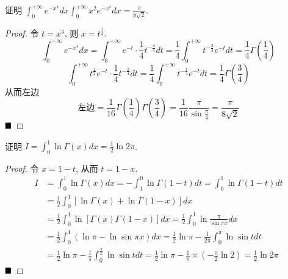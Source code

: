 \documentclass[lang=cn,newtx,10pt,scheme=chinese]{elegantbook}
\begin{document}
\begin{example}
证明 $\int_{0}^{+\infty} e^{-x^4} dx \int_{0}^{+\infty} x^2 e^{-x^4} dx = \frac{\pi}{8\sqrt{2}}$.
\end{example}

\begin{proof}
令 $t=x^4$, 则 $x=t^{\frac{1}{4}}$.
$$
\int_0^{+\infty} e^{-x^4}dx = \int_0^{+\infty} e^{-t} \cdot \frac{1}{4}t^{-\frac{3}{4}}dt = \frac{1}{4}\int_0^{+\infty} t^{-\frac{3}{4}}e^{-t}dt = \frac{1}{4}\Gamma(\frac{1}{4})
$$
$$
\int_0^{+\infty} t^{\frac{1}{2}}e^{-t} \cdot \frac{1}{4}t^{-\frac{3}{4}}dt = \frac{1}{4}\int_0^{+\infty} t^{-\frac{1}{4}}e^{-t}dt = \frac{1}{4}\Gamma(\frac{3}{4})
$$
从而左边
$$
\text{左边}= \frac{1}{16}\Gamma(\frac{1}{4})\Gamma(\frac{3}{4}) = \frac{1}{16}\frac{\pi}{\sin\frac{\pi}{4}} = \frac{\pi}{8\sqrt{2}}
$$
$\hfill \blacksquare$
\end{proof}

\begin{example}[$\bigstar \bigstar$]
证明 $I = \int_{0}^{1} \ln\Gamma(x) dx = \frac{1}{2}\ln 2\pi$.
\end{example}

\begin{proof}
令 $x=1-t$, 从而 $t=1-x$.
\begin{align*}
I &= \int_0^1 \ln\Gamma(x)dx = -\int_1^0 \ln\Gamma(1-t)dt = \int_0^1 \ln\Gamma(1-t)dt \\
&= \frac{1}{2}\int_0^1 [\ln\Gamma(x) + \ln\Gamma(1-x)]dx \\
&= \frac{1}{2}\int_0^1 \ln[\Gamma(x)\Gamma(1-x)]dx = \frac{1}{2}\int_0^1 \ln\frac{\pi}{\sin\pi x}dx \\
&= \frac{1}{2}\int_0^1 (\ln\pi - \ln\sin\pi x)dx = \frac{1}{2}\ln\pi - \frac{1}{2\pi}\int_0^{\pi} \ln\sin t dt \\
&= \frac{1}{2}\ln\pi - \frac{1}{\pi}\int_0^{\frac{\pi}{2}} \ln\sin t dt = \frac{1}{2}\ln\pi - \frac{1}{\pi} \times (-\frac{\pi}{2}\ln 2) = \frac{1}{2}\ln 2\pi
\end{align*}
$\hfill \blacksquare$
\end{proof}
\end{document}
